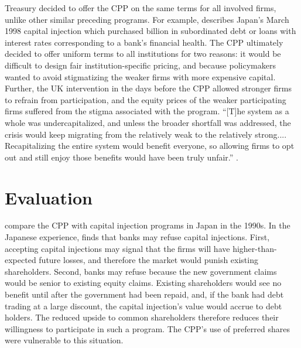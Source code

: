 \documentclass[12pt]{article}
\begin{document}
Treasury decided to offer the CPP on the same terms for all involved firms, unlike other similar preceding programs. For example, \citet{Hoshi} describes Japan's March 1998 capital injection which purchased  billion in subordinated debt or loans with interest rates corresponding to a bank's financial health. The CPP ultimately decided to offer uniform terms to all institutions for two reasons: it would be difficult to design fair institution-specific pricing, and because policymakers wanted to avoid stigmatizing the weaker firms with more expensive capital. Further, the UK intervention in the days before the CPP allowed stronger firms to refrain from participation, and the equity prices of the weaker participating firms suffered from the stigma associated with the program. ``[T]he system as a whole was undercapitalized, and unless the broader shortfall was addressed, the crisis would keep migrating from the relatively weak to the relatively strong.... Recapitalizing the entire system would benefit everyone, so allowing firms to opt out and still enjoy those benefits would have been truly unfair.'' \citep{Geithner}.

\section{Evaluation}

\citet{Hoshi} compare the CPP with capital injection programs in Japan in the 1990s. In the Japanese experience, \citet{Hoshi} finds that banks may refuse capital injections. First, accepting capital injections may signal that the firms will have higher-than-expected future losses, and therefore the market would punish existing shareholders. Second, banks may refuse because the new government claims would be senior to existing equity claims. Existing shareholders would see no benefit until after the government had been repaid, and, if the bank had debt trading at a large discount, the capital injection's value would accrue to debt holders. The reduced upside to common shareholders therefore reduces their willingness to participate in such a program. The CPP's use of preferred shares were vulnerable to this situation. 
\end{document}
